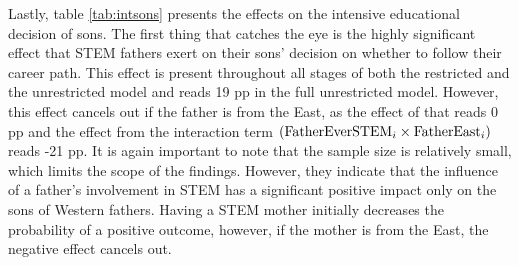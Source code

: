 \documentclass[a4paper, oneside, hyperfootnotes = false]{article}
\begin{document}
{Lastly, table \ref{tab:intsons} presents the effects on the intensive educational decision of sons.
The first thing that catches the eye is the highly significant effect that STEM fathers exert on their sons' decision on whether to follow their career path.
This effect is present throughout all stages of both the restricted and the unrestricted model and reads 19 pp in the full unrestricted model.
However, this effect cancels out if the father is from the East, as the effect of that reads 0 pp and the effect from the interaction term $(\textnormal{FatherEverSTEM}_{i} \times \textnormal{FatherEast}_{i})$  reads -21 pp.
It is again important to note that the sample size is relatively small, which limits the scope of the findings.
However, they indicate that the influence of a father's involvement in STEM has a significant positive impact only on the sons of Western fathers.
Having a STEM mother initially decreases the probability of a positive outcome, however, if the mother is from the East, the negative effect cancels out.

}
\end{document}

